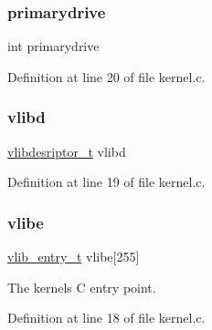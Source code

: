 \subsubsection{\texorpdfstring{primarydrive}{primarydrive}}
{\footnotesize\ttfamily int primarydrive}



Definition at line 20 of file kernel.\+c.

\mbox{\label{a00062_a2125beec541d04796805161dbec05fcf_a2125beec541d04796805161dbec05fcf}} 
\subsubsection{\texorpdfstring{vlibd}{vlibd}}
{\footnotesize\ttfamily \hyperlink{a00188_a2d9000b4fbb25c5ed2950a2d8f4921d5_a2d9000b4fbb25c5ed2950a2d8f4921d5}{vlibdesriptor\+\_\+t} vlibd}



Definition at line 19 of file kernel.\+c.

\mbox{\label{a00062_af69f4f709fdab28dec6b8fb75fb4d526_af69f4f709fdab28dec6b8fb75fb4d526}} 
\subsubsection{\texorpdfstring{vlibe}{vlibe}}
{\footnotesize\ttfamily \hyperlink{a00188_a97c1a7136f2ab06368e93c2d7533d619_a97c1a7136f2ab06368e93c2d7533d619}{vlib\+\_\+entry\+\_\+t} vlibe\mbox{[}255\mbox{]}}



The kernels C entry point. 



Definition at line 18 of file kernel.\+c.

